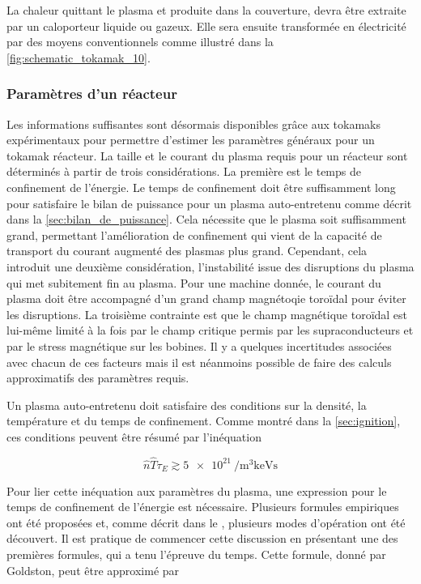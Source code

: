 \documentclass[main.tex]{subfiles}
\begin{document}
La chaleur quittant le plasma et produite dans la couverture, devra être extraite par un caloporteur liquide ou gazeux.
Elle sera ensuite transformée en électricité par des moyens conventionnels comme illustré dans la \autoref{fig:schematic_tokamak_10}.

\subsubsection*{Paramètres d'un réacteur}

Les informations suffisantes sont désormais disponibles grâce aux tokamaks expérimentaux pour permettre d'estimer les paramètres généraux pour un tokamak réacteur.
La taille et le courant du plasma requis pour un réacteur sont déterminés à partir de trois considérations.
La première est le temps de confinement de l'énergie.
Le temps de confinement doit être suffisamment long pour satisfaire le bilan de puissance pour un plasma auto-entretenu comme décrit dans la \autoref{sec:bilan_de_puissance}.
Cela nécessite que le plasma soit suffisamment grand, permettant l'amélioration de confinement qui vient de la capacité de transport du courant augmenté des plasmas plus grand.
Cependant, cela introduit une deuxième considération, l'instabilité issue des disruptions du plasma qui met subitement fin au plasma.
Pour une machine donnée, le courant du plasma doit être accompagné d'un grand champ magnétoqie toroïdal pour éviter les disruptions.
La troisième contrainte est que le champ magnétique toroïdal est lui-même limité à la fois par le champ critique permis par les supraconducteurs et par le stress magnétique sur les bobines.
Il y a quelques incertitudes associées avec chacun de ces facteurs mais il est néanmoins possible de faire des calculs approximatifs des paramètres requis.

Un plasma auto-entretenu doit satisfaire des conditions sur la densité, la température et du temps de confinement.
Comme montré dans la \autoref{sec:ignition}, ces conditions peuvent être résumé par l'inéquation

\begin{equation}
	\hat{n}\hat{T} \tau_E \gtrsim \SI{5e21}{\per\meter\cubed\kilo\electronvolt\second}
	\label{eq:inequation}
\end{equation}

Pour lier cette inéquation aux paramètres du plasma, une expression pour le temps de confinement de l'énergie est nécessaire.
Plusieurs formules empiriques ont été proposées et, comme décrit dans le \color{red}{chapitre 4 (lien à rajouter quand elle sera faite)}\color{black}, plusieurs modes d'opération ont été découvert.
Il est pratique de commencer cette discussion en présentant une des premières formules, qui a tenu l'épreuve du temps.
Cette formule, donné par Goldston, peut être approximé par
\end{document}
